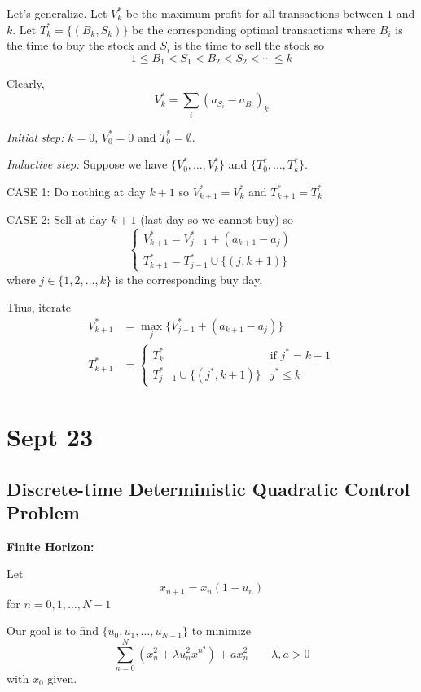\documentclass[12pt]{article}
\begin{document}
\begin{center}
    Let's generalize. Let $V_k^*$ be the maximum profit for all transactions between $1$ and $k$. Let $T_k^* = \{(B_k, S_k)\}$ be the corresponding optimal transactions where $B_i$ is the time to buy the stock and $S_i$ is the time to sell the stock so  
    \[1 \leq B_1 < S_1 < B_2 < S_2 < \cdots \leq k\]

    Clearly, 
    \[V_k^* = \sum_i (a_{S_i} - a_{B_i})_k\]

    \emph{Initial step:} $k = 0$, $V_0^* = 0$ and $T_0^* = \emptyset$.

    \emph{Inductive step:} Suppose we have $\{V_0^*, \dots, V_k^*\}$ and $\{T_0^*, \dots, T_k^*\}$. 

    CASE 1: Do nothing at day $k+1$ so $V_{k+1}^* = V_k^*$ and $T_{k+1}^* = T_k^*$

    CASE 2: Sell at day $k + 1$ (last day so we cannot buy) so 
    \[\begin{cases}
        V_{k+1}^* = V_{j-1}^* + (a_{k+1} - a_j)\\ 
        T_{k+1}^* = T_{j-1}^* \cup \{(j, k+1)\}
    \end{cases}\]
    where $j \in \{1, 2, \dots, k\}$ is the corresponding buy day. 

    Thus, iterate
    \begin{align*}
        V_{k+1}^* &= \max_{j} \{V_{j-1}^* + (a_{k+1} - a_j)\}\\ 
        T_{k+1}^* &= \begin{cases}
            T_k^* & \text{if } j^* = k + 1\\ 
            T_{j-1}^* \cup \{(j^*, k+1)\} & j^* \leq k
        \end{cases}
    \end{align*}

\section{Sept 23} 

    \subsection*{Discrete-time Deterministic Quadratic Control Problem}

    \textbf{Finite Horizon:}

    Let
    \[x_{n+1} = x_n(1 - u_n)\]
    for $n = 0, 1, \dots, N - 1$

    Our goal is to find $\{u_0, u_1, \dots, u_{N-1}\}$ to minimize 
    \[\sum_{n=0}^{N} (x_n^2 + \lambda u_n^2 x^n^2) + ax_n^2 \qquad \lambda, a > 0\]
    with $x_0$ given. 


\end{center}
\end{document}
